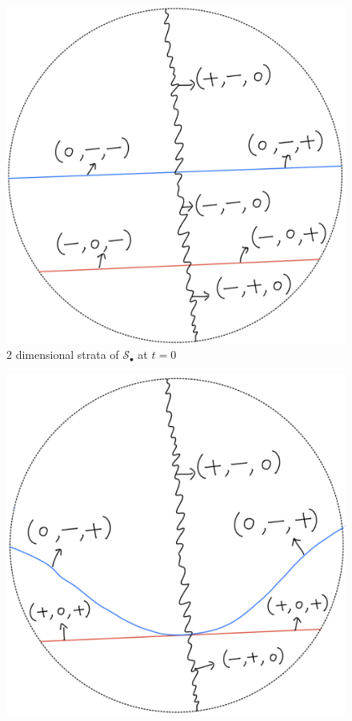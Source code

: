 \begin{definition}
\begin{enumerate}
\begin{itemize}
\begin{figure}[H]
    \centering
    \includegraphics[scale = 0.95]{diagrams/lemma1/10.png} 
    \caption{2 dimensional strata of $\mathcal{S}_\bullet$ at $t=0$}
    \label{fig:your-label}
\end{figure}
\begin{figure}[H]
    \centering
    \includegraphics[scale = 0.95]{diagrams/lemma1/11.png} 

\end{figure}
\end{itemize}
\end{enumerate}
\end{definition}

